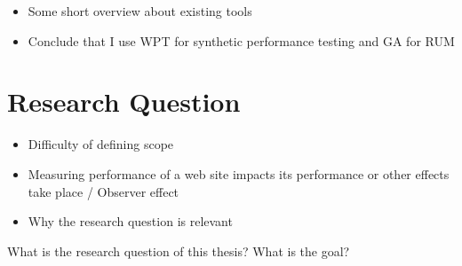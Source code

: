
\begin{itemize}
\item Some short overview about existing tools
\item Conclude that I use WPT for synthetic performance testing and GA for RUM
\end{itemize}























\section{Research Question}

\begin{itemize}
\item Difficulty of defining scope
\item Measuring performance of a web site impacts its performance or other effects take place / Observer effect
\item Why the research question is relevant
\end{itemize}

What is the research question of this thesis?
What is the goal?

























